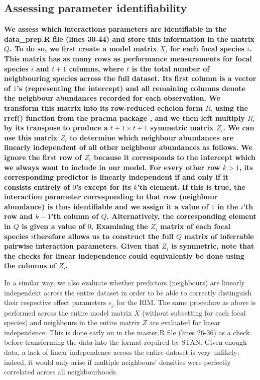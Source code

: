 \begin{refsection}
    \subsection{Assessing parameter identifiability}
    \label{SI:identify}

    \textbf{We assess which interactions parameters are identifiable in the data\_prep.R file (lines 30-44) and store this information in the matrix $Q$. To do so, we first create a model matrix $X_i$ for each focal species $i$. This matrix has as many rows as performance measurements for focal species $i$ and $t+1$ columns, where $t$ is the total number of neighbouring species across the full dataset. Its first column is a vector of $1$'s (representing the intercept) and all remaining columns denote the neighbour abundances recorded for each observation. We transform this matrix into its row-reduced echelon form $R_i$ using the rref() function from the pracma package \parencite{Borchers2022}, and we then left multiply $R_i$ by its transpose to produce a $t+1 \times t+1$ symmetric matrix $Z_i$. We can use this matrix $Z_i$ to determine which neighbour abundances are linearly independent of all other neighbour abundances as follows. We ignore the first row of $Z_i$ because it corresponds to the intercept which we always want to include in our model. For every other row $k > 1$, its corresponding predictor is linearly independent if and only if it consists entirely of $0$'s except for its $k$'th element. If this is true, the interaction parameter corresponding to that row (neighbour abundance) is thus identifiable and we assign it a value of $1$ in the $i$'th row and $k-1$'th column of $Q$. Alternatively, the corresponding element in $Q$ is given a value of $0$. Examining the $Z_i$ matrix of each focal species $i$therefore allows us to construct the full $Q$ matrix of inferrable pairwise interaction parameters. Given that $Z_i$ is symmetric, note that the checks for linear independence could equivalently be done using the columns of $Z_i$.}

    In a similar way, we also evaluate whether predictors (neighbours) are linearly independent across the entire dataset in order to be able to correctly distinguish their respective effect parameters $e_j$ for the RIM. The same procedure as above is performed across the entire model matrix $X$ (without subsetting for each focal species) and neighbours in the entire matrix $Z$ are evaluated for linear independence. This is done early on in the master.R file (lines 26-36) as a check before transforming the data into the format required by STAN. Given enough data, a lack of linear independence across the entire dataset is very unlikely; indeed, it would only arise if multiple neighbours' densities were perfectly correlated across all neighbourhoods.


\end{refsection}
